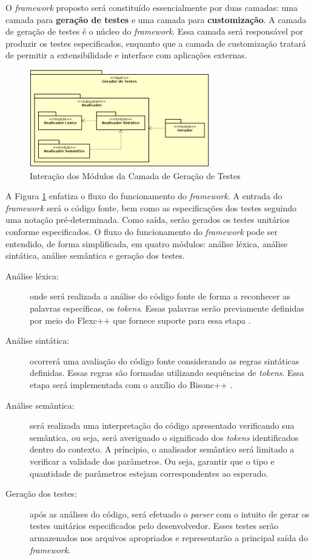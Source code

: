  \par
 \indent O \textit{framework} proposto será constituído essencialmente por duas camadas: uma camada para \textbf{geração de testes} e uma camada para \textbf{customização}. A camada de geração de testes é o núcleo do \textit{framework}. Essa camada será responsável por produzir os testes especificados, enquanto que a camada de customização tratará de permitir a extensibilidade e interface com aplicações externas.
 
   \begin{figure}[h]
    \centering
    \includegraphics[width=0.7\textwidth]{figuras/module-view-generator.png}
    \caption{Interação dos Módulos da Camada de Geração de Testes}
    \label{fig:entradasesaidas}
 \end{figure}
 
 \par
\indent A Figura \ref{fig:entradasesaidas} enfatiza o fluxo do funcionamento do \textit{framework}. A entrada do \textit{framework} será o código fonte, bem como as especificações dos testes seguindo uma notação pré-determinada. Como saída, serão gerados os testes unitários conforme especificados. O fluxo do funcionamento do \textit{framework} pode ser entendido, de forma simplificada, em quatro módulos: análise léxica, análise sintática, análise semântica e geração dos testes. 
 \begin{description}
 \item[Análise léxica:] onde será realizada a análise do código fonte de forma a reconhecer as palavras específicas, os \textit{tokens}. Essas palavras serão previamente definidas por meio do Flexc++ que fornece suporte para essa etapa \cite{flexcpp2015}.
 \item[Análise sintática:] ocorrerá uma avaliação do código fonte considerando as regras sintáticas definidas. Essas regras são formadas utilizando sequências de \textit{tokens}. Essa etapa será implementada com o auxílio do Bisonc++ \cite{bisoncpp2015}.
 \item[Análise semântica:] será realizada uma interpretação do código apresentado verificando sua semântica, ou seja, será averiguado o significado dos \textit{tokens} identificados dentro do contexto. A príncipio, o analisador semântico será limitado a verificar a validade dos parâmetros. Ou seja, garantir que o tipo e quantidade de parâmetros estejam correspondentes ao esperado.
  \item[Geração dos testes:] após as análises do código, será efetuado o \textit{parser} com o intuito de gerar os testes unitários especificados pelo desenvolvedor. Esses testes serão armazenados nos arquivos apropriados e representarão a principal saída do \textit{framework}.
 \end{description}
 
